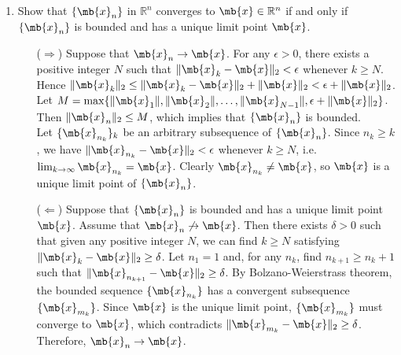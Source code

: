 \newcommand{\school}{\text{University of Science and Technology of China}}
\newcommand{\course}{\text{Introduction to Machine Learning}}
\newcommand{\semester}{\text{Fall 2022}}
\newcommand{\lecturer}{\text{Jie Wang}}
\newcommand{\posted}{\text{Sep. 17, 2022}}
\newcommand{\due}{\text{Oct. 8, 2022}}
\newcommand{\hwno}{\text{1}}
\newcommand{\name}{\text{Yunqin Zhu}}
\newcommand{\id}{\text{PB20061372}}


\maketitle


\begin{exercise}
	\begin{enumerate}

		\item Show that $\{\mb{x}_n\}$ in $\mathbb{R}^n$ converges to $\mb{x}\in \mathbb{R}^n$ if and only if $\{\mb{x}_n\}$ is bounded and has a unique limit point $\mb{x}$.

			\begin{solution}
				\begin{itemize}
					\item []
					\item [($\Rightarrow$)]
						Suppose that $\mb{x}_n \to \mb{x}$.
						For any $\epsilon>0$, there exists a positive integer $N$ such that $\|\mb{x}_k-\mb{x}\|_2 < \epsilon$ whenever $k\ge N$.
						Hence $\|\mb{x}_k\|_2\le \|\mb{x}_k-\mb{x}\|_2+\|\mb{x}\|_2 < \epsilon + \|\mb{x}\|_2$.
						Let $M = \max \{\|\mb{x}_1\|, \|\mb{x}_2\|, \dots, \|\mb{x}_{N-1}\|, \epsilon + \|\mb{x}\|_2\}$.
						Then $\|\mb{x}_n\|_2\le M$, which implies that $\{\mb{x}_n\}$ is bounded.\\
						Let $\{\mb{x}_{n_k}\}_k$ be an arbitrary subsequence of $\{\mb{x}_n\}$.
						Since $n_k\ge k$, we have $\|\mb{x}_{n_k}-\mb{x}\|_2 < \epsilon$ whenever $k\ge N$, i.e. $\lim_{k\to\infty}\mb{x}_{n_k}=\mb{x}$.
						Clearly $\mb{x}_{n_k} \neq \mb{x}$, so $\mb{x}$ is a unique limit point of $\{\mb{x}_n\}$.
					\item [($\Leftarrow$)]
						Suppose that $\{\mb{x}_n\}$ is bounded and has a unique limit point $\mb{x}$. Assume that $\mb{x}_n\not\to \mb{x}$.
						Then there exists $\delta>0$ such that given any positive integer $N$, we can find $k\ge N$ satisfying $\|\mb{x}_k-\mb{x}\|_2\ge \delta$.
						Let $n_1 = 1$ and, for any $n_k$, find $n_{k+1}\ge n_k + 1$ such that $\|\mb{x}_{n_{k+1}}-\mb{x}\|_2\ge \delta$.
						By Bolzano-Weierstrass theorem, the bounded sequence $\{\mb{x}_{n_k}\}$ has a convergent subsequence $\{\mb{x}_{m_k}\}$.
						Since $\mb{x}$ is the unique limit point, $\{\mb{x}_{m_k}\}$ must converge to $\mb{x}$, which contradicts $\|\mb{x}_{m_k}-\mb{x}\|_2\ge \delta$.
						Therefore, $\mb{x}_n\to \mb{x}$.
						\qedhere
				\end{itemize}
			\end{solution}


\end{enumerate}
\end{exercise}

